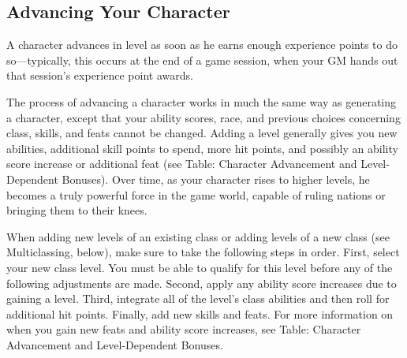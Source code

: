\subsection{Advancing Your Character}

				
A character advances in level as soon as he earns enough experience points to do so---typically, this occurs at the end of a game session, when your GM hands out that session's experience point awards.
				
The process of advancing a character works in much the same way as generating a character, except that your ability scores, race, and previous choices concerning class, skills, and feats cannot be changed. Adding a level generally gives you new abilities, additional skill points to spend, more hit points, and possibly an ability score increase or additional feat (see Table: Character Advancement and Level-Dependent Bonuses). Over time, as your character rises to higher levels, he becomes a truly powerful force in the game world, capable of ruling nations or bringing them to their knees.
				
When adding new levels of an existing class or adding levels of a new class (see Multiclassing, below), make sure to take the following steps in order. First, select your new class level. You must be able to qualify for this level before any of the following adjustments are made. Second, apply any ability score increases due to gaining a level. Third, integrate all of the level's class abilities and then roll for additional hit points. Finally, add new skills and feats. For more information on when you gain new feats and ability score increases, see Table: Character Advancement and Level-Dependent Bonuses.



